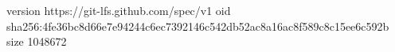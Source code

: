 version https://git-lfs.github.com/spec/v1
oid sha256:4fe36bc8d66e7e94244c6ec7392146c542db52ac8a16ac8f589c8c15ee6c592b
size 1048672
